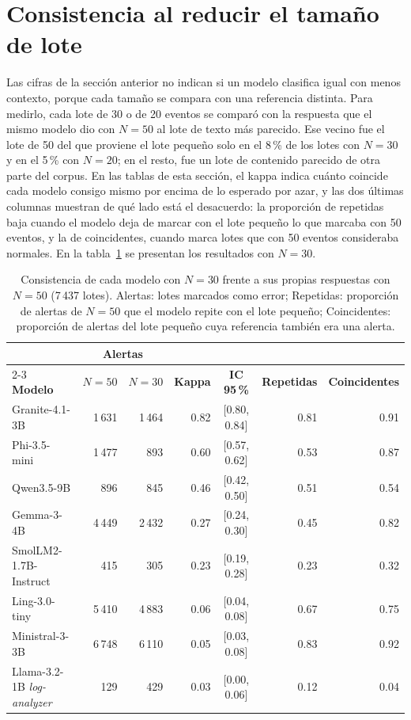 \section{Consistencia al reducir el tamaño de lote}\label{sec:res_consistencia}

Las cifras de la sección anterior no indican si un modelo clasifica igual con menos contexto, porque cada tamaño se compara con una referencia distinta. Para medirlo, cada lote de 30 o de 20 eventos se comparó con la respuesta que el mismo modelo dio con $N = 50$ al lote de texto más parecido. Ese vecino fue el lote de 50 del que proviene el lote pequeño solo en el 8\,\% de los lotes con $N = 30$ y en el 5\,\% con $N = 20$; en el resto, fue un lote de contenido parecido de otra parte del corpus. En las tablas de esta sección, el kappa indica cuánto coincide cada modelo consigo mismo por encima de lo esperado por azar, y las dos últimas columnas muestran de qué lado está el desacuerdo: la proporción de repetidas baja cuando el modelo deja de marcar con el lote pequeño lo que marcaba con 50 eventos, y la de coincidentes, cuando marca lotes que con 50 eventos consideraba normales. En la tabla~\ref{tab:res_consistencia} se presentan los resultados con $N = 30$.

\begin{table}[H]
\centering
\caption{Consistencia de cada modelo con $N = 30$ frente a sus propias respuestas con $N = 50$ (7\,437 lotes). Alertas: lotes marcados como error; Repetidas: proporción de alertas de $N = 50$ que el modelo repite con el lote pequeño; Coincidentes: proporción de alertas del lote pequeño cuya referencia también era una alerta.}
\label{tab:res_consistencia}
\small
\setlength{\tabcolsep}{4pt}
\begin{tabular}{@{}lrrrcrr@{}}
\toprule
 & \multicolumn{2}{c}{\textbf{Alertas}} & & & & \\
\cmidrule(lr){2-3}
\textbf{Modelo} & \textbf{$N = 50$} & \textbf{$N = 30$} & \textbf{Kappa} & \textbf{IC 95\,\%} & \textbf{Repetidas} & \textbf{Coincidentes} \\
\midrule
Granite-4.1-3B & 1\,631 & 1\,464 & 0.82 & [0.80, 0.84] & 0.81 & 0.91 \\
Phi-3.5-mini & 1\,477 & 893 & 0.60 & [0.57, 0.62] & 0.53 & 0.87 \\
Qwen3.5-9B & 896 & 845 & 0.46 & [0.42, 0.50] & 0.51 & 0.54 \\
Gemma-3-4B & 4\,449 & 2\,432 & 0.27 & [0.24, 0.30] & 0.45 & 0.82 \\
SmolLM2-1.7B-Instruct & 415 & 305 & 0.23 & [0.19, 0.28] & 0.23 & 0.32 \\
Ling-3.0-tiny & 5\,410 & 4\,883 & 0.06 & [0.04, 0.08] & 0.67 & 0.75 \\
Ministral-3-3B & 6\,748 & 6\,110 & 0.05 & [0.03, 0.08] & 0.83 & 0.92 \\
Llama-3.2-1B \textit{log-analyzer} & 129 & 429 & 0.03 & [0.00, 0.06] & 0.12 & 0.04 \\
\bottomrule
\end{tabular}
\normalsize
\end{table}

